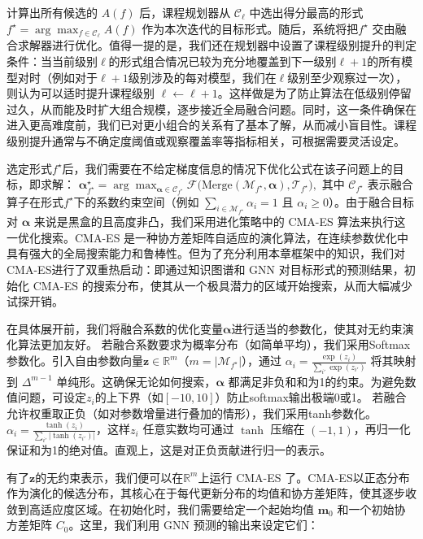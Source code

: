 \documentclass[../main.tex]{subfiles}
\begin{document}
计算出所有候选的 $A(f)$ 后，课程规划器从 $\mathcal{C}_\ell$ 中选出得分最高的形式$f^\star = \arg\max_{f\in\mathcal{C}_\ell} A(f)$ 作为本次迭代的目标形式。随后，系统将把$f^\star$ 交由融合求解器进行优化。值得一提的是，我们还在规划器中设置了课程级别提升的判定条件：当当前级别$\ell$的形式组合情况已较为充分地覆盖到下一级别$\ell+1$的所有模型对时（例如对于$\ell+1$级别涉及的每对模型，我们在$\ell$级别至少观察过一次），则认为可以适时提升课程级别 $\ell \leftarrow \ell+1$。这样做是为了防止算法在低级别停留过久，从而能及时扩大组合规模，逐步接近全局融合问题。同时，这一条件确保在进入更高难度前，我们已对更小组合的关系有了基本了解，从而减小盲目性。课程级别提升通常与不确定度阈值或观察覆盖率等指标相关，可根据需要灵活设定。

选定形式$f^\star$后，我们需要在不给定梯度信息的情况下优化公式在该子问题上的目标，即求解：
$\boldsymbol{\alpha}^\star_{f^\star} = \arg\max_{\boldsymbol{\alpha}\in \mathcal{C}_{f^\star}} \mathcal{F}\Big(\mathrm{Merge}(\mathcal{M}_{f^\star}, \boldsymbol{\alpha}), \mathcal{T}_{f^\star}\Big),$
其中 $\mathcal{C}_{f^\star}$ 表示融合算子在形式$f^\star$下的系数约束空间（例如 $\sum_{i\in \mathcal{M}_{f^\star}} \alpha_i = 1$ 且 $\alpha_i \ge 0$）。由于融合目标对 $\boldsymbol{\alpha}$ 来说是黑盒的且高度非凸，我们采用进化策略中的 CMA-ES 算法来执行这一优化搜索。CMA-ES 是一种协方差矩阵自适应的演化算法，在连续参数优化中具有强大的全局搜索能力和鲁棒性。但为了充分利用本章框架中的知识，我们对CMA-ES进行了双重热启动：即通过知识图谱和 GNN 对目标形式的预测结果，初始化 CMA-ES 的搜索分布，使其从一个极具潜力的区域开始搜索，从而大幅减少试探开销。

在具体展开前，我们将融合系数的优化变量$\boldsymbol{\alpha}$进行适当的参数化，使其对无约束演化算法更加友好。
若融合系数要求为概率分布（如简单平均），我们采用Softmax参数化。引入自由参数向量$\mathbf{z}\in \mathbb{R}^m$（$m=|\mathcal{M}_{f^\star}|$），通过 $\alpha_i = \frac{\exp(z_i)}{\sum_{i'} \exp(z_{i'})}$ 将其映射到 $\Delta^{m-1}$ 单纯形。这确保无论如何搜索，$\boldsymbol{\alpha}$ 都满足非负和和为1的约束。为避免数值问题，可设定$z_i$的上下界（如$[-10,10]$）防止softmax输出极端0或1。
若融合允许权重取正负（如对参数增量进行叠加的情形），我们采用tanh参数化。$\alpha_i = \frac{\tanh(z_i)}{\sum_{i'}|\tanh(z_{i'})|}$，这样$z_i$ 任意实数均可通过 $\tanh$ 压缩在 $(-1,1)$，再归一化保证和为1的绝对值。直观上，这是对正负贡献进行归一的表示。

有了$\mathbf{z}$的无约束表示，我们便可以在$\mathbb{R}^m$上运行 CMA-ES 了。CMA-ES以正态分布作为演化的候选分布，其核心在于每代更新分布的均值和协方差矩阵，使其逐步收敛到高适应度区域。在初始化时，我们需要给定一个起始均值 $\mathbf{m}_0$ 和一个初始协方差矩阵 $C_0$。这里，我们利用 GNN 预测的输出来设定它们：
\end{document}
